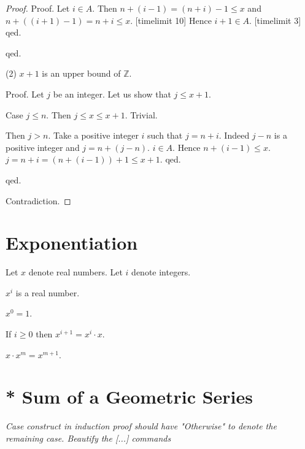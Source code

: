 \documentclass{article}
\begin{document}
\begin{forthel}
\begin{proof}
  Proof. Let $i \in A$. Then
  $n + (i -1) = (n + i) - 1 \leq x$ and
  $n + ((i + 1) - 1) = n + i \leq x$.
[timelimit 10]
  Hence $i + 1 \in A$.
[timelimit 3]
  qed.

qed.

(2) $x + 1$ is an upper bound of $\mathbb{Z}$.

Proof.
Let $j$ be an integer. Let us show that $j \leq x + 1$.

Case $j \leq n$. Then $j \leq x \leq x + 1$. Trivial.

Then $j > n$. Take a positive integer $i$
such that $j = n + i$. 
Indeed $j - n$ is a positive integer and  
$j = n + (j-n)$.
$i \in A$.
Hence $n + (i-1) \leq x$. $j = n+i = (n + (i-1)) + 1 \leq x + 1$.
qed.

qed.

Contradiction.
\end{proof}



\end{forthel}

\section{Exponentiation}

\begin{forthel}
Let $x$ denote real numbers.
Let $i$ denote integers.

\begin{signature} $x^{i}$ is a real number.
\end{signature}

\begin{axiom} $x^{0} = 1$. \end{axiom}

\begin{axiom} If $i \geq 0$ then $x^{i+1} = x^{i} \cdot x$.
\end{axiom}

\begin{lemma}
$x \cdot x^{m} = x^{m+1}$.
\end{lemma}

\end{forthel}

\section{* Sum of a Geometric Series}

\newcommand{\sumgeom}[2]{\sum_{0 \leq i < #2} {#1}^i}

{\em Case construct in induction proof should have 
"Otherwise" to denote the remaining case. Beautify the 
[...] commands}
\end{document}
